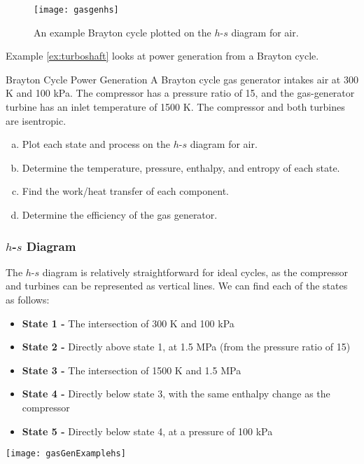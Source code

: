 \begin{figure}[H]
  \centering
  \texttt{[image: gasgenhs]}
  \caption{An example Brayton cycle plotted on the $h$-$s$ diagram for air.}
  \label{fig:turboshafths}
\end{figure}

Example \ref{ex:turboshaft} looks at power generation from a Brayton cycle.


\begin{example}[label=ex:turboshaft]{Brayton Cycle Power Generation}
  A Brayton cycle gas generator intakes air at 300 K and 100 kPa.  The compressor has a pressure ratio of 15, and the gas-generator turbine has an inlet temperature of 1500 K. The compressor and both turbines are isentropic.  

  \begin{enumerate}[a)]
  \item Plot each state and process on the $h$-$s$ diagram for air.
  \item Determine the temperature, pressure, enthalpy, and entropy of each state.
  \item Find the work/heat transfer of each component.
  \item Determine the efficiency of the gas generator.
  \end{enumerate}

  \subsubsection*{$h$-$s$ Diagram}
  The $h$-$s$ diagram is relatively straightforward for ideal cycles, as the compressor and turbines can be represented as vertical lines.  We can find each of the states as follows:
  \begin{itemize}
  \item {\bf State 1 - } The intersection of 300 K and 100 kPa
  \item {\bf State 2 - } Directly above state 1, at 1.5 MPa (from the pressure ratio of 15)
  \item {\bf State 3 - } The intersection of 1500 K and 1.5 MPa
  \item {\bf State 4 - } Directly below state 3, with the same enthalpy change as the compressor
  \item {\bf State 5 - } Directly below state 4, at a pressure of 100 kPa
  \end{itemize}

  \begin{center}
    \texttt{[image: gasGenExamplehs]}
  \end{center}


\end{example}
